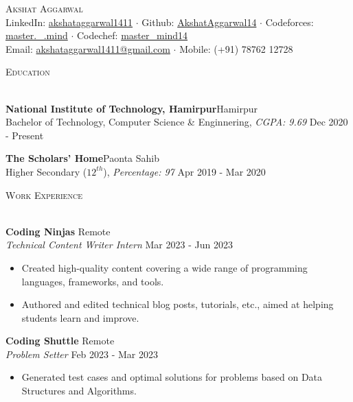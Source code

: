 \documentclass[a4paper]{article}
\newcommand{\bulletSep} { \vspace{1.5mm} }
\newcommand{\sectionSep} { \vspace{3mm} }
\newcommand{\lineunder} {
    \vspace*{-8pt} \\
    \hspace*{-15pt} \hrulefill \\
}
\newcommand{\header} [1] {
    {\hspace*{-18pt}\vspace*{6pt} {
        \fontfamily{qcs}\selectfont \large \scshape #1
    }}
    \vspace*{-6pt} \lineunder
    \vspace{1mm}
}
\newcommand{\educationItem}[5]{
    \textbf{#1}\hfill #2\\
    #3, \textit{#4} \hfill #5\\
}
\newcommand{\experienceItem}[5]{
    \textbf{#1} \hfill #2 \\
    \textit{#3} \hfill #4 \\
    \begin{itemize}
        #5
    \end{itemize}
}
\begin{document}

\begin{center}
    {\Huge \scshape {}\selectfont Akshat Aggarwal}\\
    \vspace{1mm}
    LinkedIn: \href{https://www.linkedin.com/in/akshataggarwal1411/}{akshataggarwal1411} $\cdot$
    Github: \href{https://github.com/AkshatAggarwal14}{AkshatAggarwal14} $\cdot$
    Codeforces: \href{https://codeforces.com/profile/master._.mind}{master.\_.mind} $\cdot$
    Codechef: \href{https://www.codechef.com/users/master_mind14}{master\_mind14} \\
    \vspace{0.5mm}
    Email: \href {mailto:akshataggarwal1411@gmail.com}{akshataggarwal1411@gmail.com} $\cdot$ Mobile: (+91) 78762 12728\\
\end{center}

\vspace{-2mm}


\header{Education}

\educationItem{National Institute of Technology, Hamirpur}{Hamirpur}{Bachelor of Technology, Computer Science \& Enginnering}{CGPA: 9.69}{Dec 2020 - Present}
\bulletSep

\educationItem{The Scholars' Home}{Paonta Sahib}{Higher Secondary ($12^{th}$)}{Percentage: 97}{Apr 2019 - Mar 2020}
\sectionSep


\header{Work Experience}

\experienceItem{Coding Ninjas}{Remote}{Technical Content Writer Intern}{Mar 2023 - Jun 2023}{
    \item Created high-quality content covering a wide range of programming languages, frameworks, and tools.
    \item Authored and edited technical blog posts, tutorials, etc., aimed at helping students learn and improve.
}
\bulletSep

\experienceItem{Coding Shuttle}{Remote}{Problem Setter}{Feb 2023 - Mar 2023}{
    \item Generated test cases and optimal solutions for problems based on Data Structures and Algorithms.
}
\sectionSep

\end{document}
